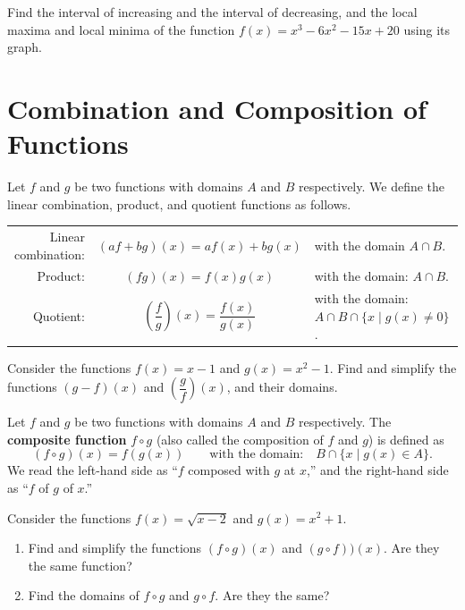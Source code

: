 \begin{exercise}
  Find the interval of increasing and the interval of decreasing, and the local maxima and local minima of the function $f(x)=x^3-6x^2-15x+20$ using its graph.
\end{exercise}

\newpage

\section{Combination and Composition of Functions}

\begin{definition}
  Let \(f\) and \(g\) be two functions with domains $A$ and $B$ respectively. We define the linear combination, product, and quotient functions as follows.
  \begin{center}
    \begin{tabular}{rcl}
      Linear combination: & $(af+bg)(x)=af(x)+bg(x)$ & with the domain $A\cap B$.\\
      Product: & $(fg)(x)=f(x)g(x)$ & with the domain: $A\cap B$.\\
      Quotient: & $\left(\dfrac{f}{g}\right)(x)=\dfrac{f(x)}{g(x)}$ & with the domain: $A\cap B\cap \{x\mid g(x)\neq 0\}$.
    \end{tabular}
  \end{center}
  
\end{definition}

\begin{example}
  Consider the functions \(f(x)=x-1\) and \(g(x)=x^2-1\). Find and simplify the functions \((g-f)(x)\) and \(\left(\dfrac{g}{f}\right)(x)\), and their domains.
\end{example}

\begin{definition}
  Let \(f\) and \(g\) be two functions with domains $A$ and $B$ respectively. The \textbf{composite function} $f\circ g$ (also called the
  composition of $f$ and $g$) is defined as
  \[(f\circ g)(x)=f(g(x))\qquad \text{with the domain:}\quad B\cap \{x\mid g(x)\in A\}.\]
\noindent
  We read the left-hand side as ``\(f\) composed with \(g\) at \(x\),'' and the right-hand side as ``\(f\) of \(g\) of \(x\).''
\end{definition}

\begin{example}
  Consider the functions \(f(x)=\sqrt{x-2}\) and \(g(x)=x^2+1\). 
  \begin{enumerate}
    \item Find and simplify the functions \((f\circ g)(x)\) and \((g\circ f))(x)\).  Are they the same function?
    \item Find the domains of $f\circ g$ and $g\circ f$. Are they the same?
  \end{enumerate}
\end{example}

